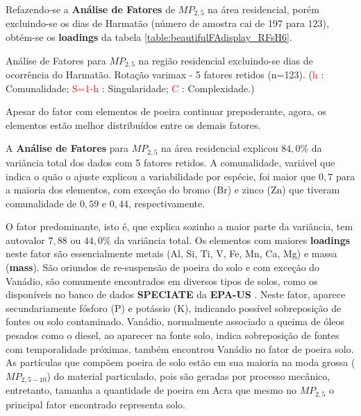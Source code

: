 Refazendo-se a \textbf{Análise de Fatores} de $MP_{2,5}$ na área residencial, 
porém excluindo-se os dias de Harmatão (número de amostra cai de 197 para 123), 
obtém-se os \textbf{loadings} da tabela \ref{table:beautifulFAdisplay_RFsH6}. 

\begin{table}[H]
  
  \caption{Análise de Fatores para $MP_{2,5}$ na região residencial
           excluindo-se dias de ocorrência do Harmatão.
           Rotação varimax - 5 fatores retidos (n=123).
           (\textcolor{red}{h} : Comunalidade; 
           \textcolor{red}{S=1-h} : Singularidade; 
           \textcolor{red}{C} : Complexidade.)
           \label{table:beautifulFAdisplay_RFsH5}}
\end{table}

Apesar do fator com elementos de poeira continuar prepoderante, agora, os 
elementos estão melhor distribuídos entre os demais fatores.  

A \textbf{Análise de Fatores} para $MP_{2,5}$ na área residencial explicou 
$84,0\%$ da variância total dos dados com 5 fatores retidos.
A comunalidade, variável que indica o quão o ajuste explicou a variabilidade por 
espécie, foi maior que $0,7$ para a maioria dos elementos,
com exceção do bromo (Br) e zinco (Zn) que tiveram comunalidade de $0,59$ e 
$0,44$, respectivamente.

O fator predominante, isto é, que explica sozinho a maior parte da variância, 
tem autovalor $7,88$ ou $44,0\%$ da variância total.
Os elementos com maiores \textbf{loadings} neste fator são essencialmente 
metais (Al, Si, Ti, V, Fe, Mn, Ca, Mg) e massa (\textbf{mass}).
São oriundos de re-suspensão de poeira do solo e com exceção do Vanádio,
são comumente encontrados em diversos tipos de solos, como os disponíveis no 
banco de dados \textbf{SPECIATE} da \textbf{EPA-US} \citep{simon2010}.
Neste fator, aparece secundariamente fósforo (P) e potássio (K), indicando 
possível sobreposição de fontes ou solo contaminado. 
Vanádio, normalmente associado a queima de óleos pesados como o diesel, ao 
aparecer na fonte solo, indica sobreposição de fontes com temporalidade próximas.
\cite{aboh2009} também encontrou Vanádio no fator de poeira solo.
As partículas que compõem poeira de solo estão em sua maioria na moda grossa 
($MP_{2,5-10}$) do material particulado, pois são geradas por processo mecânico,
entretanto, tamanha a quantidade de poeira em Acra que mesmo no $MP_{2,5}$ o 
principal fator encontrado representa solo.  

